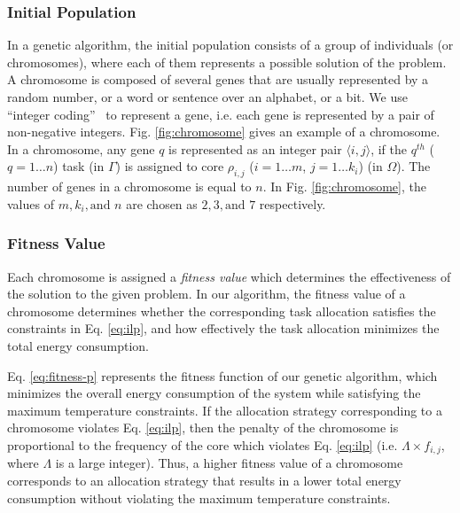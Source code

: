 \documentclass[conference]{IEEEtran}
\begin{document}
\subsubsection{Initial Population} In a genetic algorithm, the initial population consists of a group of individuals (or chromosomes),
where each of them
represents a possible solution of the problem.
A chromosome is composed of several genes that are usually
represented by a random number, or a word or sentence over an
alphabet, or a bit. We use ``integer coding''~\cite{Goldberg} to represent a gene,
i.e. each gene is represented by a pair of non-negative integers. Fig. \ref{fig:chromosome} gives an example of a chromosome. %
In a chromosome, any gene $q$ is represented as an integer pair $\langle i,j\rangle$, if  the $q^{th}$ ($q=1\ldots n$) task (in $\Gamma$) is
assigned to core $\rho_{i,j}$ ($i=1\ldots m$, $j=1\ldots k_i$) (in $\Omega$). The number of genes in a chromosome is equal to $n$.
In  Fig. \ref{fig:chromosome}, the values of $m, k_i, \text{and } n$ are chosen as $2, 3, \text{and } 7$ respectively.


\subsubsection{Fitness Value} Each chromosome is assigned a \emph{fitness value} which determines the effectiveness of the solution
to the given problem. In our algorithm, the fitness value of a chromosome determines whether the corresponding task allocation
satisfies the constraints  in Eq. \ref{eq:ilp}, and how effectively
the task allocation minimizes the
total energy consumption.

Eq. \ref{eq:fitness-p} represents the fitness function of our genetic algorithm, which minimizes the
overall energy consumption of the system while satisfying the maximum temperature constraints.
If the allocation strategy corresponding to a chromosome violates Eq. \ref{eq:ilp}, then the penalty of the chromosome is
proportional to the frequency of the core
which violates  Eq. \ref{eq:ilp} (i.e. $\Lambda \times f_{i,j}$, where
$\Lambda$ is a large integer).
Thus, a higher fitness value of a chromosome corresponds to an allocation strategy that results in
a lower total energy consumption without violating the maximum temperature constraints.


\end{document}
